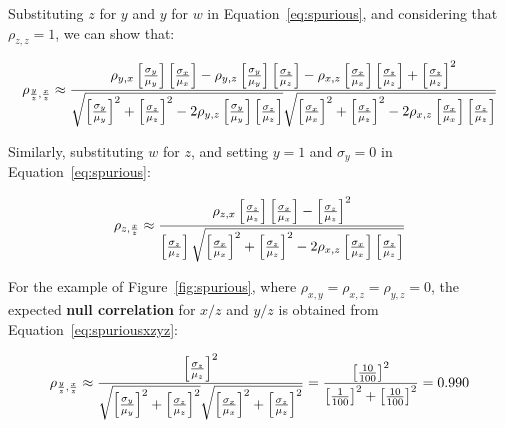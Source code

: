 \begin{enumerate}
Substituting $z$ for $y$ and $y$ for $w$ in
Equation~\ref{eq:spurious}, and considering that $\rho_{z,z}=1$, we
can show that:

\begin{equation}
  \noindent \rho_{\frac{y}{z},\frac{x}{z}} \approx
  \frac{\rho_{y,x}\left[\frac{\sigma_y}{\mu_y}\right]
    \left[\frac{\sigma_x}{\mu_x}\right] -
    \rho_{y,z}\left[\frac{\sigma_y}{\mu_y}\right]
    \left[\frac{\sigma_z}{\mu_z}\right] -
    \rho_{x,z}\left[\frac{\sigma_x}{\mu_x}\right]
    \left[\frac{\sigma_z}{\mu_z}\right] +
    \left[\frac{\sigma_z}{\mu_z}\right]^2
  }{
    \sqrt{\left[\frac{\sigma_y}{\mu_y}\right]^2 +
      \left[\frac{\sigma_z}{\mu_z}\right]^2 -
      2 \rho_{y,z}\left[\frac{\sigma_y}{\mu_y}\right]
      \left[\frac{\sigma_z}{\mu_z}\right]}
    \sqrt{\left[\frac{\sigma_x}{\mu_x}\right]^2 +
      \left[\frac{\sigma_z}{\mu_z}\right]^2 -
      2 \rho_{x,z}\left[\frac{\sigma_x}{\mu_x}\right]
      \left[\frac{\sigma_z}{\mu_z}\right]
    }
  }
  \label{eq:spuriousxzyz}
\end{equation}

Similarly, substituting $w$ for $z$, and setting $y=1$ and
$\sigma_y=0$ in Equation~\ref{eq:spurious}:

\begin{equation}
  \noindent \rho_{z,\frac{x}{z}} \approx
  \frac{\rho_{z,x}\left[\frac{\sigma_z}{\mu_z}\right]
    \left[\frac{\sigma_x}{\mu_x}\right] -
    \left[\frac{\sigma_z}{\mu_z}\right]^2
  }{
    \left[\frac{\sigma_z}{\mu_z}\right]
    \sqrt{\left[\frac{\sigma_x}{\mu_x}\right]^2 +
      \left[\frac{\sigma_z}{\mu_z}\right]^2 -
      2 \rho_{x,z}\left[\frac{\sigma_x}{\mu_x}\right]
      \left[\frac{\sigma_z}{\mu_z}\right]
    }
  }
  \label{eq:spuriouszxz}
\end{equation}

For the example of Figure~\ref{fig:spurious}, where
$\rho_{x,y}=\rho_{x,z}=\rho_{y,z}=0$, the expected \textbf{null
  correlation} for $x/z$ and $y/z$ is obtained from
Equation~\ref{eq:spuriousxzyz}:

\begin{equation}
  \noindent \rho_{\frac{y}{z},\frac{x}{z}} \approx
  \frac{
    \left[\frac{\sigma_z}{\mu_z}\right]^2
  }{
    \sqrt{\left[\frac{\sigma_y}{\mu_y}\right]^2 +
      \left[\frac{\sigma_z}{\mu_z}\right]^2}
    \sqrt{\left[\frac{\sigma_x}{\mu_x}\right]^2 +
      \left[\frac{\sigma_z}{\mu_z}\right]^2}
  }
  =
  \frac{
    \left[\frac{10}{100}\right]^2
  }{
    \left[\frac{1}{100}\right]^2 +
      \left[\frac{10}{100}\right]^2
  }
  = 0.990
  \label{eq:spuriousxzyzindepxyz}
\end{equation}


\end{enumerate}
